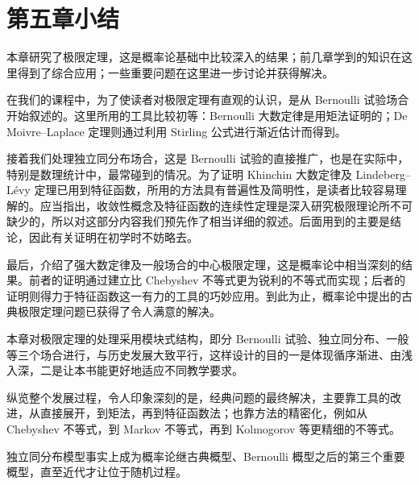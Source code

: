 \documentclass[../../main.tex]{subfiles}
\begin{document}
\section*{第五章小结}\label{section:ch05-小结}

本章研究了极限定理，这是概率论基础中比较深入的结果；前几章学到的知识在这里得到了综合应用；一些重要问题在这里进一步讨论并获得解决。

在我们的课程中，为了使读者对极限定理有直观的认识，是从 Bernoulli 试验场合开始叙述的。这里所用的工具比较初等：Bernoulli 大数定律是用矩法证明的；De Moivre--Laplace 定理则通过利用 Stirling 公式进行渐近估计而得到。

接着我们处理独立同分布场合，这是 Bernoulli 试验的直接推广，也是在实际中，特别是数理统计中，最常碰到的情况。为了证明 Khinchin 大数定律及 Lindeberg--Lévy 定理已用到特征函数，所用的方法具有普遍性及简明性，是读者比较容易理解的。应当指出，收敛性概念及特征函数的连续性定理是深入研究极限理论所不可缺少的，所以对这部分内容我们预先作了相当详细的叙述。后面用到的主要是结论，因此有关证明在初学时不妨略去。

最后，介绍了强大数定律及一般场合的中心极限定理，这是概率论中相当深刻的结果。前者的证明通过建立比 Chebyshev 不等式更为锐利的不等式而实现；后者的证明则得力于特征函数这一有力的工具的巧妙应用。到此为止，概率论中提出的古典极限定理问题已获得了令人满意的解决。

本章对极限定理的处理采用模块式结构，即分 Bernoulli 试验、独立同分布、一般等三个场合进行，与历史发展大致平行，这样设计的目的一是体现循序渐进、由浅入深，二是让本书能更好地适应不同教学要求。

纵览整个发展过程，令人印象深刻的是，经典问题的最终解决，主要靠工具的改进，从直接展开，到矩法，再到特征函数法；也靠方法的精密化，例如从 Chebyshev 不等式，到 Markov 不等式，再到 Kolmogorov 等更精细的不等式。

独立同分布模型事实上成为概率论继古典概型、Bernoulli 概型之后的第三个重要概型，直至近代才让位于随机过程。
\end{document}
